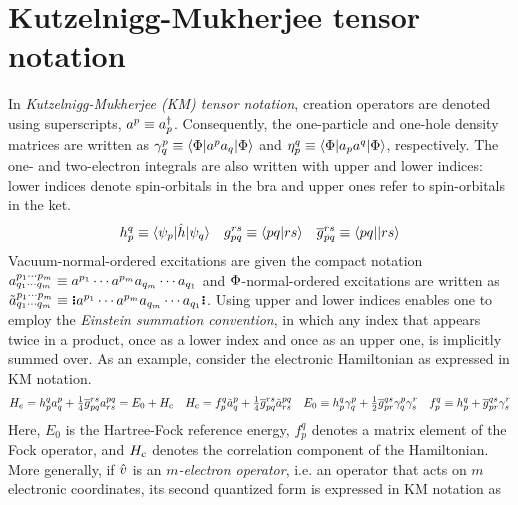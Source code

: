 \documentclass[11pt]{article}
\numberwithin{equation}{section}
\begin{document}
\setlength{\abovedisplayskip}{3pt}
\setlength{\belowdisplayskip}{3pt}

\setcounter{section}{2}
\section{Kutzelnigg-Mukherjee tensor notation}

\begin{ntt}\label{ntt:kutzelnigg-mukherjee-notation}
In \textit{Kutzelnigg-Mukherjee (KM) tensor notation}, creation operators are denoted using superscripts, $a^p\equiv a_p^\dagger$.
Consequently, the one-particle and one-hole density matrices are written as
$
  \gamma ^p_q
\equiv
  \langle\Phi |a^pa_q|\Phi \rangle
$
and
$
  \eta _p^q
\equiv
  \langle\Phi |a_p a^q|\Phi \rangle
$,
respectively.
The one- and two-electron integrals are also written with upper and lower indices: lower indices denote spin-orbitals in the bra and upper ones refer to spin-orbitals in the ket.
\begin{align}
  h_p^q
\equiv
  \langle\psi _p|\hat{h}|\psi _q\rangle
&&
  g_{pq}^{rs}
\equiv
  \langle pq|rs\rangle
&&
  \overline{g}_{pq}^{rs}
\equiv
  \langle pq||rs\rangle
\end{align}
Vacuum-normal-ordered excitations are given the compact notation
$
  a^{p_1\cdots p_m}_{q_1\cdots q_m}
\equiv
  a^{p_1}\cdots a^{p_m}a_{q_m}\cdots a_{q_1}
$
and $\Phi $-normal-ordered excitations are written as
$
  \tl{a}^{p_1\cd p_m}_{q_1\cd q_m}
\equiv
  \gno{a^{p_1}\cd a^{p_m}a_{q_m}\cd a_{q_1}}
$.
Using upper and lower indices enables one to employ the \textit{Einstein summation convention}, in which any index that appears twice in a product, once as a lower index and once as an upper one, is implicitly summed over.
As an example, consider the electronic Hamiltonian as expressed in KM notation.
\begin{align}
  H_e
=
  h_p^q
  a^p_q
+
  \tfrac{1}{4}
  \overline{g}_{pq}^{rs}
  a^{pq}_{rs}
=
  E_0
+
  H_{\mathrm{c}}
&&
  H_{\mathrm{c}}
=
  f_p^q
  \tilde{a}^p_q
+
  \tfrac{1}{4}
  \overline{g}_{pq}^{rs}
  \tilde{a}^{pq}_{rs}
&&
  E_0
\equiv
  h_p^q
  \gamma ^p_q
+
  \tfrac{1}{2}
  \overline{g}_{pr}^{qs}
  \gamma ^p_q
  \gamma ^r_s
&&
  f_p^q
\equiv
  h_p^q
+
  \overline{g}_{pr}^{qs}
  \gamma _s^r
\end{align}
Here, $E_0$ is the Hartree-Fock reference energy, $f_p^q$ denotes a matrix element of the Fock operator, and $H_{\mathrm{c}}$ denotes the correlation component of the Hamiltonian.
More generally, if $\hat{v}$ is an \textit{$m$-electron operator}, i.e. an operator that acts on $m$ electronic coordinates, its second quantized form is expressed in KM notation as

\end{ntt}
\end{document}
